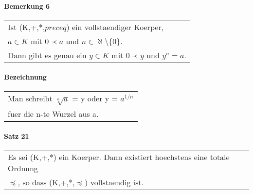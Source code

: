 \documentclass[a4paper]{scrartcl}
\begin{document}
\paragraph{Bemerkung 6}
\begin{tabbing}
\begin{tabular}{l}
Ist (K,+,*,$preceq$) ein vollstaendiger Koerper,\\
$a \in K $ mit $0 \prec a$ und $n \in \aleph \setminus \{ 0\}$.\\
Dann gibt es genau ein $y \in K$ mit $0\prec y$ und $y^n = a$.
\end{tabular}
\end{tabbing}

\paragraph{Bezeichnung}
\begin{tabbing}
\begin{tabular}{l}
Man schreibt $ \sqrt[n]{a}$ = y oder y = $a^{1/n}$\\
fuer die n-te Wurzel aus a.
\end{tabular}
\end{tabbing}

\paragraph{Satz 21}
\begin{tabbing}
\begin{tabular}{l}
Es sei (K,+,*) ein Koerper. Dann existiert hoechstens eine totale Ordnung\\
$\preceq$, so dass (K,+,*,$\preceq$) vollstaendig ist. 
\end{tabular}
\end{tabbing}
\end{document}
